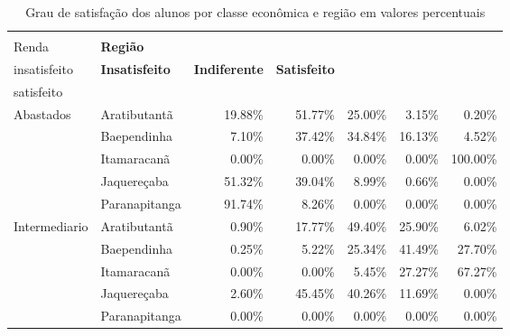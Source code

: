 \begin{table}[h]
\scriptsize
\centering
\caption{Grau de satisfação dos alunos por classe econômica e região em valores percentuais}
\label{tabela:q16p}
\vspace{0.5em}
\begin{tabular}{ll rrrrr}
\toprule
\textbf{\specialcell{c}{Classe de \\Renda}}   & \textbf{Região}  & \textbf{\specialcell{c}{Muito\\insatisfeito}} & \textbf{Insatisfeito} & \textbf{Indiferente} & \textbf{Satisfeito} & \textbf{\specialcell{c}{Muito\\satisfeito}}\\
\midrule
Abastados     & Aratibutantã              &              19.88\% &        51.77\% &       25.00\% &       3.15\% &             0.20\% \\ 
                & Baependinha             &               7.10\% &        37.42\% &       34.84\% &      16.13\% &             4.52\% \\ 
                & Itamaracanã             &               0.00\% &         0.00\% &        0.00\% &       0.00\% &           100.00\% \\ 
                & Jaquereçaba             &              51.32\% &        39.04\% &        8.99\% &       0.66\% &             0.00\% \\ 
                & Paranapitanga           &              91.74\% &         8.26\% &        0.00\% &       0.00\% &             0.00\% \\ 
\midrule                                                                                                                           
     Intermediario & Aratibutantã         &               0.90\% &        17.77\% &       49.40\% &      25.90\% &             6.02\% \\ 
                & Baependinha             &               0.25\% &         5.22\% &       25.34\% &      41.49\% &            27.70\% \\ 
                & Itamaracanã             &               0.00\% &         0.00\% &        5.45\% &      27.27\% &            67.27\% \\ 
                & Jaquereçaba             &               2.60\% &        45.45\% &       40.26\% &      11.69\% &             0.00\% \\ 
                & Paranapitanga           &               0.00\% &         0.00\% &        0.00\% &       0.00\% &             0.00\% \\ 

\end{tabular}
\end{table}
